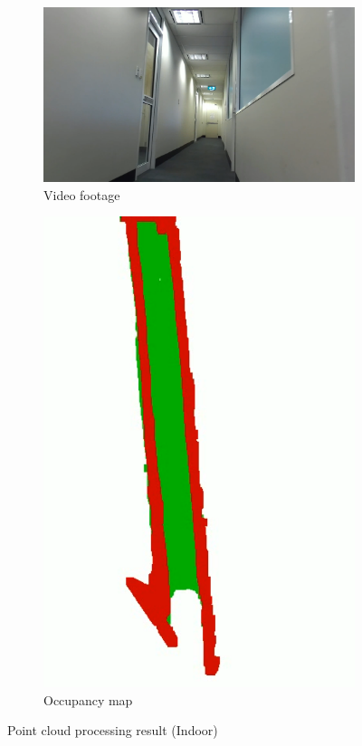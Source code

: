 \begin{figure}[p]
    \centering
    \begin{subfigure}{.6\textwidth}
        \centering
        \includegraphics[width=\linewidth]{images/pcloud_indoor_video.PNG}
        \caption{Video footage}
    \end{subfigure}
    \quad
    \begin{subfigure}{.3\textwidth}
        \centering
        \includegraphics[width=\linewidth,frame]{images/pcloud_indoor.PNG}
        \caption{Occupancy map}
    \end{subfigure}
    \caption{Point cloud processing result (Indoor)}
    \label{fig:pcloud_indoor}
\end{figure}

